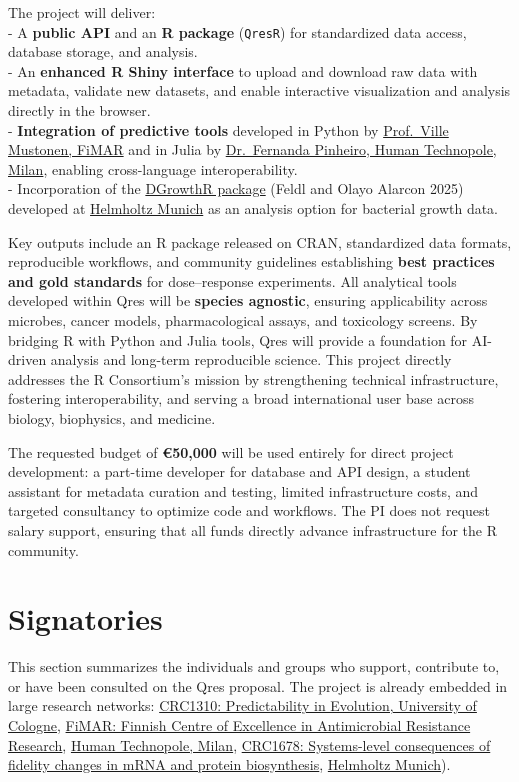 \documentclass[
  letterpaper,
  DIV=11,
  numbers=noendperiod]{scrartcl}
\begin{document}
The project will deliver:\\
- A \textbf{public API} and an \textbf{R package} (\texttt{QresR}) for
standardized data access, database storage, and analysis.\\
- An \textbf{enhanced R Shiny interface} to upload and download raw data
with metadata, validate new datasets, and enable interactive
visualization and analysis directly in the browser.\\
- \textbf{Integration of predictive tools} developed in Python by
\href{https://www.fimar.fi/}{Prof.~Ville Mustonen, FiMAR} and in Julia
by \href{https://humantechnopole.it/en/}{Dr.~Fernanda Pinheiro, Human
Technopole, Milan}, enabling cross-language interoperability.\\
- Incorporation of the
\href{https://bio-datascience.github.io/DGrowthR/}{DGrowthR package}
(Feldl and Olayo Alarcon 2025) developed at
\href{https://www.helmholtz-munich.de/en}{Helmholtz Munich} as an
analysis option for bacterial growth data.

Key outputs include an R package released on CRAN, standardized data
formats, reproducible workflows, and community guidelines establishing
\textbf{best practices and gold standards} for dose--response
experiments. All analytical tools developed within Qres will be
\textbf{species agnostic}, ensuring applicability across microbes,
cancer models, pharmacological assays, and toxicology screens. By
bridging R with Python and Julia tools, Qres will provide a foundation
for AI-driven analysis and long-term reproducible science. This project
directly addresses the R Consortium's mission by strengthening technical
infrastructure, fostering interoperability, and serving a broad
international user base across biology, biophysics, and medicine.

The requested budget of \textbf{€50,000} will be used entirely for
direct project development: a part-time developer for database and API
design, a student assistant for metadata curation and testing, limited
infrastructure costs, and targeted consultancy to optimize code and
workflows. The PI does not request salary support, ensuring that all
funds directly advance infrastructure for the R community.

\section{Signatories}\label{signatories}

This section summarizes the individuals and groups who support,
contribute to, or have been consulted on the Qres proposal. The project
is already embedded in large research networks:
\href{https://crc1310.uni-koeln.de/}{CRC1310: Predictability in
Evolution, University of Cologne}, \href{https://www.fimar.fi/}{FiMAR:
Finnish Centre of Excellence in Antimicrobial Resistance Research},
\href{https://humantechnopole.it/en/}{Human Technopole, Milan},
\href{https://crc1678.uni-koeln.de/}{CRC1678: Systems-level consequences
of fidelity changes in mRNA and protein biosynthesis},
\href{https://www.helmholtz-munich.de/en}{Helmholtz Munich}).
\end{document}
